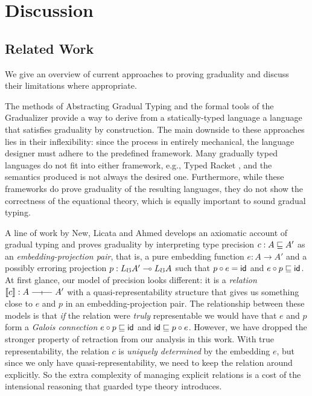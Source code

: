 \section{Discussion}\label{sec:discussion}

\subsection{Related Work}

We give an overview of current approaches to proving graduality and discuss
their limitations where appropriate.


The methods of Abstracting Gradual Typing \cite{garcia-clark-tanter2016} and the
formal tools of the Gradualizer \cite{cimini-siek2016} provide a way to derive
from a statically-typed language a language that satisfies graduality by
construction. The main downside to these approaches lies in their inflexibility:
since the process in entirely mechanical, the language designer must adhere to
the predefined framework.  Many gradually typed languages do not fit into either
framework, e.g., Typed Racket \cite{tobin-hochstadt06, tobin-hochstadt08}, and
the semantics produced is not always the desired one.
%
Furthermore, while these frameworks do prove graduality of the resulting
languages, they do not show the correctness of the equational theory, which is
equally important to sound gradual typing.



A line of work by New, Licata and Ahmed
\cite{new-ahmed2018,new-licata18,new-licata-ahmed2019} develops an axiomatic
account of gradual typing and proves graduality by interpreting type precision
$c : A \sqsubseteq A'$ as an \emph{embedding-projection pair}, that is, a pure
embedding function $e : A \to A'$ and a possibly erroring projection $p : L_\mho A'
\multimap L_\mho A$ such that $p \circ e = \mathsf{id}$ and $e \circ p \sqsubseteq \mathsf{id}$. At
first glance, our model of precision looks different: it is a \emph{relation}
$\sem{c} : A \rel A'$ with a quasi-representability structure that gives us
something close to $e$ and $p$ in an embedding-projection pair. The relationship
between these models is that \emph{if} the relation were \emph{truly}
representable we would have that $e$ and $p$ form a \emph{Galois connection} $e
\circ p \sqsubseteq \mathsf{id}$ and $\mathsf{id} \sqsubseteq p \circ e$. However, we have dropped the
stronger property of retraction from our analysis in this work. With true
representability, the relation $c$ is \emph{uniquely determined} by the
embedding $e$, but since we only have quasi-representability, we need to keep
the relation around explicitly. So the extra complexity of managing explicit
relations is a cost of the intensional reasoning that guarded type theory
introduces.

